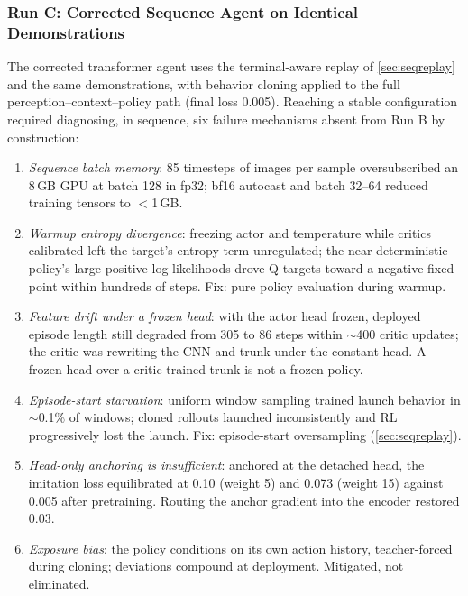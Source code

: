 \documentclass[conference]{IEEEtran}
\begin{document}
\subsubsection{Run C: Corrected Sequence Agent on Identical Demonstrations}

\label{sec:runc}

The corrected transformer agent uses the terminal-aware replay of \cref{sec:seqreplay} and the same demonstrations, with behavior cloning applied to the full perception--context--policy path (final loss 0.005). Reaching a stable configuration required diagnosing, in sequence, six failure mechanisms absent from Run B by construction:

\begin{enumerate}

    \item \emph{Sequence batch memory}: 85 timesteps of images per sample oversubscribed an 8\,GB GPU at batch 128 in fp32; bf16 autocast and batch 32--64 reduced training tensors to $<$1\,GB.

    \item \emph{Warmup entropy divergence}: freezing actor and temperature while critics calibrated left the target's entropy term unregulated; the near-deterministic policy's large positive log-likelihoods drove Q-targets toward a negative fixed point within hundreds of steps. Fix: pure policy evaluation during warmup.

    \item \emph{Feature drift under a frozen head}: with the actor head frozen, deployed episode length still degraded from 305 to 86 steps within $\sim$400 critic updates; the critic was rewriting the CNN and trunk under the constant head. A frozen head over a critic-trained trunk is not a frozen policy.

    \item \emph{Episode-start starvation}: uniform window sampling trained launch behavior in $\sim$0.1\% of windows; cloned rollouts launched inconsistently and RL progressively lost the launch. Fix: episode-start oversampling (\cref{sec:seqreplay}).

    \item \emph{Head-only anchoring is insufficient}: anchored at the detached head, the imitation loss equilibrated at 0.10 (weight 5) and 0.073 (weight 15) against 0.005 after pretraining. Routing the anchor gradient into the encoder restored 0.03.

    \item \emph{Exposure bias}: the policy conditions on its own action history, teacher-forced during cloning; deviations compound at deployment. Mitigated, not eliminated.

\end{enumerate}
\end{document}
